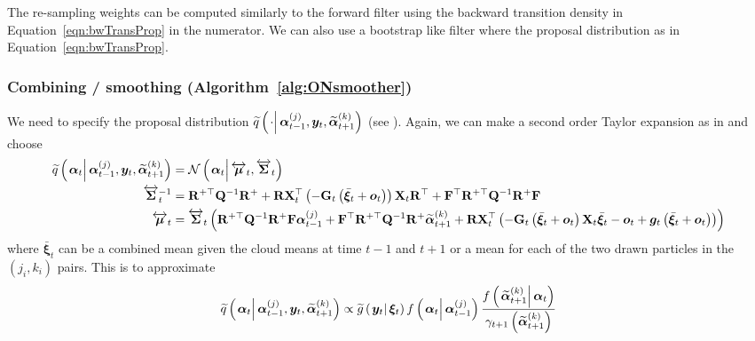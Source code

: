 \documentclass[notitlepage]{article}
\renewcommand{\vec}[1]{\bm{#1}}
\newcommand{\vecb}[1]{\bar{\vec{#1}}}
\newcommand{\vecLRarrow}[1]{\overleftrightarrow{\vec{#1}}}
\newcommand{\mat}[1]{\mathbf{#1}}
\newcommand{\matLRarrow}[1]{\overleftrightarrow{\mat{#1}}}
\newcommand{\Lparen}[1]{\left( #1\right)}
\newcommand{\Cond}[2]{\left. #1 \vphantom{#2} \right\vert  #2}
\newcommand{\optor}[2]{#1\Lparen{#2}}
\newcommand{\optorC}[3]{\optor{#1}{\Cond{#2}{#3}}}
\newcommand{\normalC}[3]{\optorC{\mathcal{N}}{#1}{#2,#3}}
\newcommand{\IDAproxC}[2]{\optorC{\widetilde{q}}{#1}{#2}}
\newcommand{\partic}[3]{#1_{#2}^{\Lparen{#3}}}
\newcommand{\particB}[3]{\widetilde{#1}_{#2}^{\Lparen{#3}}}
\begin{document}
The re-sampling weights can be computed similarly to the forward filter using the backward transition density in Equation~\eqref{eqn:bwTransProp} in the numerator. We can also use a bootstrap like filter where the proposal distribution as in Equation~\eqref{eqn:bwTransProp}.

\subsubsection*{Combining / smoothing (Algorithm~\ref{alg:ONsmoother})}
We need to specify the proposal distribution $\IDAproxC{\cdot}{\partic{\vec{\alpha}}{t-1}{j},\vec{y}_t, \particB{\vec{\alpha}}{t+1}{k}}$ (see \citet[page 453] {fearnhead10}). Again, we can make a second order Taylor expansion as in \cite{fearnhead10} and choose%
%
{\scriptsize%
\begin{equation}\begin{split}\label{eqn:approx_smooth}
	\IDAproxC{\vec{\alpha}_t}{\partic{\vec{\alpha}}{t-1}{j},\vec{y}_t, \particB{\vec{\alpha}}{t+1}{k}}  &=   %
		\normalC{\vec{\alpha}_t}{\vecLRarrow{\mu}_t}{\matLRarrow{\Sigma}_t} \\	
%
	\matLRarrow{\Sigma}_t^{-1} &=
		\mat{R}^{+\top}\mat{Q}^{-1}\mat{R}^+ +
		\mat{R}\mat{X}_t^\top\Lparen{-\mat{G}_t\Lparen{\vecb{\xi}_{t} + \vec{o}_t}}
		\mat{X}_t\mat{R}^\top + 
		\mat{F}^\top\mat{R}^{+\top}\mat{Q}^{-1}
		\mat{R}^{+}\mat{F}  \\
%
	\vecLRarrow{\mu}_t
	 &=  \matLRarrow{\Sigma}_t \Lparen{
		\mat{R}^{+\top}\mat{Q}^{-1}\mat{R}^+
		\mat{F}\partic{\vec{\alpha}}{t-1}{j} +
		\mat{F}^\top\mat{R}^{+\top}\mat{Q}^{-1}
		\mat{R}^+\particB{\vec{\alpha}}{t + 1}{k} +
		\mat{R}\mat{X}_t^\top
		\Lparen{
			-\mat{G}_t\Lparen{\vecb{\xi}_{t} + \vec{o}_t}
			\mat{X}_t\vecb{\xi}_{t} - \vec{o}_t +
			\vec{g}_t\Lparen{\vecb{\xi}_{t} + \vec{o}_t}
		}}
\end{split}\end{equation}%
}%
%
where $\vecb{\xi}_t$ can be a combined mean given the cloud means at time $t - 1$ and $t + 1$ or a mean for each of the  two drawn particles in the $(j_i,k_i)$ pairs. This is to approximate%
%
%
\begin{equation}\begin{split}
	\IDAproxC{\vec{\alpha}_t}{\partic{\vec{\alpha}}{t-1}{j},\vec{y}_t, \particB{\vec{\alpha}}{t+1}{k}} \propto %
%
	\optorC{\widetilde{g}}{\vec{y}_t}{\vec{\xi}_t}
		\optorC{f}{\vec{\alpha}_t}{\partic{\vec{\alpha}}{t-1}{j}}
		\frac{
			\optorC{f}{\particB{\vec{\alpha}}{t+1}{k}}{\vec{\alpha}_t}
		}{
			\gamma_{t + 1}\Lparen{\particB{\vec{\alpha}}{t+1}{k}}
		}
\end{split}\end{equation}
\end{document}
